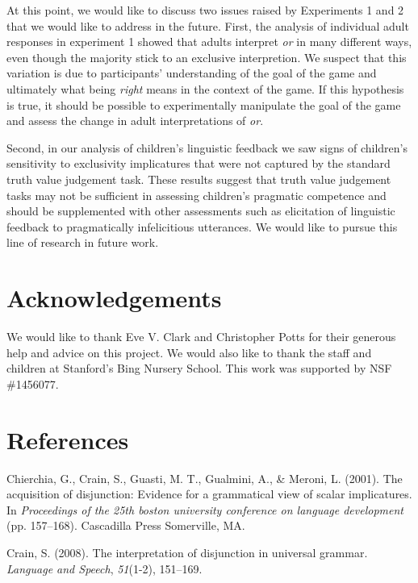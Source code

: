 \documentclass[10pt, letterpaper]{article}
\begin{document}
At this point, we would like to discuss two issues raised by Experiments
1 and 2 that we would like to address in the future. First, the analysis
of individual adult responses in experiment 1 showed that adults
interpret \emph{or} in many different ways, even though the majority
stick to an exclusive interpretion. We suspect that this variation is
due to participants' understanding of the goal of the game and
ultimately what being \emph{right} means in the context of the game. If
this hypothesis is true, it should be possible to experimentally
manipulate the goal of the game and assess the change in adult
interpretations of \emph{or}.

Second, in our analysis of children's linguistic feedback we saw signs
of children's sensitivity to exclusivity implicatures that were not
captured by the standard truth value judgement task. These results
suggest that truth value judgement tasks may not be sufficient in
assessing children's pragmatic competence and should be supplemented
with other assessments such as elicitation of linguistic feedback to
pragmatically infelicitious utterances. We would like to pursue this
line of research in future work.

\section{Acknowledgements}\label{acknowledgements}

We would like to thank Eve V. Clark and Christopher Potts for their
generous help and advice on this project. We would also like to thank
the staff and children at Stanford's Bing Nursery School. This work was
supported by NSF \#1456077.

\section{References}\label{references}

\setlength{\parindent}{-0.1in} \setlength{\leftskip}{0.125in} \noindent

\hypertarget{refs}{}
\hypertarget{ref-chierchia2001acquisition}{}
Chierchia, G., Crain, S., Guasti, M. T., Gualmini, A., \& Meroni, L.
(2001). The acquisition of disjunction: Evidence for a grammatical view
of scalar implicatures. In \emph{Proceedings of the 25th boston
university conference on language development} (pp. 157--168).
Cascadilla Press Somerville, MA.

\hypertarget{ref-crain2008interpretation}{}
Crain, S. (2008). The interpretation of disjunction in universal
grammar. \emph{Language and Speech}, \emph{51}(1-2), 151--169.
\end{document}

